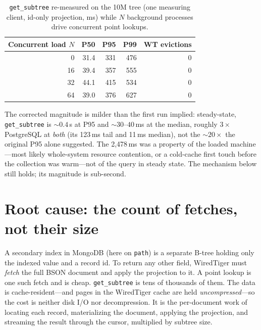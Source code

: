 \documentclass[11pt]{article}
\newcommand{\code}[1]{\texttt{#1}}
\newcommand{\hdr}{\rowcolor{hdrgray}}
\newenvironment{ctab}{\par\medskip\centering\small
  \setlength{\tabcolsep}{5pt}\renewcommand{\arraystretch}{1.12}}{\par\medskip}
\begin{document}
\begin{table}[h]
\caption{\code{get\_subtree} re-measured on the 10M tree (one measuring client,
id-only projection, ms) while $N$ background processes drive concurrent point
lookups.}
\label{tab:remeasure}
\begin{ctab}
\begin{tabular}{@{}rrrrr@{}}
\toprule
\hdr Concurrent load $N$ & P50 & P95 & P99 & WT evictions \\
\midrule
0  & 31.4 & 331 & 476 & 0 \\
16 & 39.4 & 357 & 555 & 0 \\
32 & 44.1 & 415 & 534 & 0 \\
64 & 39.0 & 376 & 627 & 0 \\
\bottomrule
\end{tabular}
\end{ctab}
\end{table}

The corrected magnitude is milder than the first run implied: steady-state,
\code{get\_subtree} is ${\sim}0.4$\,s at P95 and ${\sim}30$--$40$\,ms at the
median, roughly $3\times$ PostgreSQL at \emph{both} (its 123\,ms tail and 11\,ms
median), not the ${\sim}20\times$ the original P95 alone suggested. The 2{,}478\,ms
was a property of the loaded machine---most likely whole-system resource
contention, or a cold-cache first touch before the collection was warm---not of
the query in steady state. The mechanism below still holds; its magnitude is
sub-second.

\section{Root cause: the count of fetches, not their size}

A secondary index in MongoDB (here on \code{path}) is a separate B-tree holding
only the indexed value and a record id. To return any other field, WiredTiger
must \emph{fetch} the full BSON document and apply the projection to it. A point
lookup is one such fetch and is cheap. \code{get\_subtree} is tens of thousands
of them. The data is cache-resident---and pages in the WiredTiger cache are held
\emph{uncompressed}---so the cost is neither disk I/O nor decompression. It is the
per-document work of locating each record, materializing the document, applying
the projection, and streaming the result through the cursor, multiplied by
subtree size.
\end{document}
